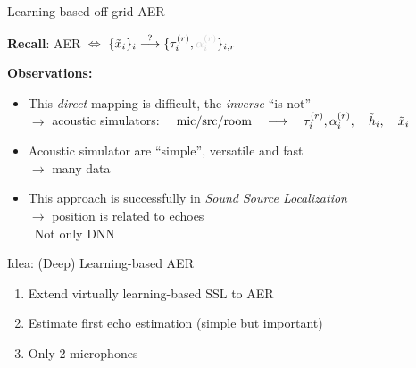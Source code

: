 \begin{frame}{Learning-based off-grid AER \hfill \faBrain}

    \textbf{Recall}: AER $\Leftrightarrow$ $\{\contMic_i\}_i \overset{?}{\longrightarrow} \{ \tauir, \textcolor{black!20}{\ampir} \}_{i,r}$

    \vfill
    \textbf{Observations:}
    \begin{itemize}
        \item This \textit{direct} mapping is difficult, the \textit{inverse} ``is not''
        \\$\rightarrow$ acoustic simulators:
            $\quad \text{mic/src/room}
            \quad \longrightarrow \quad
            \tau_i^{(r)},\alpha_i^{(r)}, \quad \tilde{h}_i, \quad \tilde{x}_i$
        \item Acoustic simulator are ``simple'', versatile and fast
        \\$\to$ many data
        \item This approach is successfully in \textit{Sound Source Localization}
        \\$\to$ position is related to echoes
        \\{\small\cite{nguyen2018autonomous,perotin2019regression} \textcolor{myred}{\faExclamationTriangle~Not only DNN}}
    \end{itemize}

    \vfill
    \begin{mydefblock}{Idea: (Deep) Learning-based AER}
        \begin{enumerate}
            \item Extend \alert{virtually} learning-based SSL to AER
            \item Estimate first echo estimation (simple but important)
            \item Only 2 microphones
        \end{enumerate}
    \end{mydefblock}

\end{frame}

